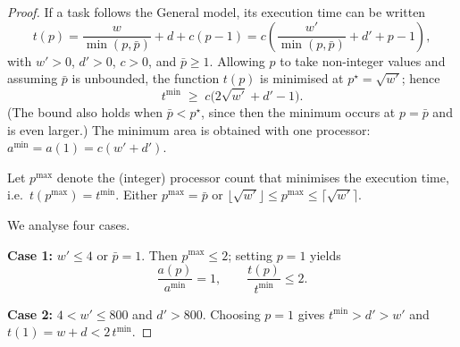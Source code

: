 \documentclass{article}
\begin{document}
\begin{proof}
If a task follows the General model, its execution time can be written
\[
t(p)=\frac{w}{\min(p,\bar p)}+d+c(p-1)
     =c\!\left(\frac{w'}{\min(p,\bar p)}+d'+p-1\right),
\]
with $w'>0$, $d'>0$, $c>0$, and $\bar p\ge1$.
Allowing $p$ to take non-integer values and assuming $\bar p$ is unbounded,
the function $t(p)$ is minimised at
$p^{\star}=\sqrt{w'}$; hence
\[
t^{\min}\;\ge\;c\bigl(2\sqrt{w'}+d'-1\bigr).
\]
(The bound also holds when $\bar p<p^{\star}$, since then the minimum occurs
at $p=\bar p$ and is even larger.)
The minimum area is obtained with one processor:
$a^{\min}=a(1)=c(w'+d')$.

Let $p^{\max}$ denote the (integer) processor count that minimises the
execution time, i.e.\ $t(p^{\max})=t^{\min}$.  
Either $p^{\max}=\bar p$ or
$\lfloor\sqrt{w'}\rfloor\le p^{\max}\le\lceil\sqrt{w'}\rceil$.

We analyse four cases.

\textbf{Case 1:} $w'\le4$ or $\bar p=1$.  
Then $p^{\max}\le2$; setting $p=1$ yields
\[
\frac{a(p)}{a^{\min}}=1,
\qquad
\frac{t(p)}{t^{\min}}\le2.
\]

\textbf{Case 2:} $4<w'\le800$ and $d'>800$.  
Choosing $p=1$ gives $t^{\min}>d'>w'$ and
$t(1)=w+d<2\,t^{\min}$.



\end{proof}
\end{document}
